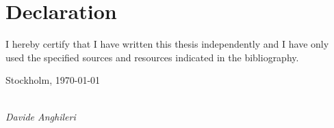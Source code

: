 \pagestyle{empty}
\chapter*{Declaration}




\vspace*{2cm}
\noindent
I hereby certify that I have written this thesis independently and I have only used the specified sources and resources indicated in the bibliography.

\vspace{2cm}

\noindent
Stockholm, \today

\vspace{3cm}

\hspace*{7cm}%
\dotfill\\
\hspace*{8.5cm}%
\textit{Davide Anghileri}
